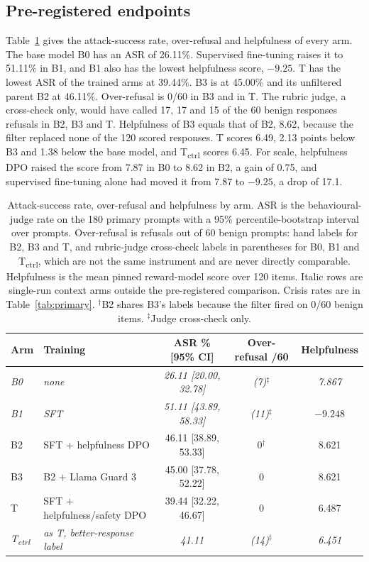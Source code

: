 \documentclass[10pt]{article} %
\newcommand{\Bz}{B0}
\newcommand{\Bo}{B1}
\newcommand{\Bt}{B2}
\newcommand{\Bth}{B3}
\newcommand{\T}{T}
\newcommand{\Tctrl}{T\textsubscript{ctrl}}
\begin{document}
\subsection{Pre-registered endpoints}
\label{sec:prereg}
Table~\ref{tab:main} gives the attack-success rate, over-refusal and helpfulness of every arm. The base model \Bz{} has an ASR of 26.11\%. Supervised fine-tuning raises it to 51.11\% in \Bo{}, and \Bo{} also has the lowest helpfulness score, $-9.25$. \T{} has the lowest ASR of the trained arms at 39.44\%. \Bth{} is at 45.00\% and its unfiltered parent \Bt{} at 46.11\%. Over-refusal is 0/60 in \Bth{} and in \T{}. The rubric judge, a cross-check only, would have called 17, 17 and 15 of the 60 benign responses refusals in \Bt{}, \Bth{} and \T{}. Helpfulness of \Bth{} equals that of \Bt{}, 8.62, because the filter replaced none of the 120 scored responses. \T{} scores 6.49, 2.13 points below \Bth{} and 1.38 below the base model, and \Tctrl{} scores 6.45. For scale, helpfulness DPO raised the score from 7.87 in \Bz{} to 8.62 in \Bt{}, a gain of 0.75, and supervised fine-tuning alone had moved it from 7.87 to $-9.25$, a drop of 17.1.

\begin{table}[t]
\caption{Attack-success rate, over-refusal and helpfulness by arm. ASR is the behavioural-judge rate on the 180 primary prompts with a 95\% percentile-bootstrap interval over prompts. Over-refusal is refusals out of 60 benign prompts: hand labels for \Bt{}, \Bth{} and \T{}, and rubric-judge cross-check labels in parentheses for \Bz{}, \Bo{} and \Tctrl{}, which are not the same instrument and are never directly comparable. Helpfulness is the mean pinned reward-model score over 120 items. Italic rows are single-run context arms outside the pre-registered comparison. Crisis rates are in Table~\ref{tab:primary}. $^\dagger$\Bt{} shares \Bth{}'s labels because the filter fired on 0/60 benign items. $^\ddagger$Judge cross-check only.}
\label{tab:main}
\begin{center}
\small
\begin{tabular}{llccc}
\toprule
Arm & Training & ASR \% [95\% CI] & Over-refusal /60 & Helpfulness \\
\midrule
\textit{\Bz{}} & \textit{none} & \textit{26.11 [20.00, 32.78]} & \textit{(7)}$^\ddagger$ & \textit{7.867} \\
\textit{\Bo{}} & \textit{SFT} & \textit{51.11 [43.89, 58.33]} & \textit{(11)}$^\ddagger$ & \textit{$-9.248$} \\
\Bt{} & SFT $+$ helpfulness DPO & 46.11 [38.89, 53.33] & 0$^\dagger$ & 8.621 \\
\Bth{} & \Bt{} $+$ Llama Guard 3 & 45.00 [37.78, 52.22] & 0 & 8.621 \\
\T{} & SFT $+$ helpfulness/safety DPO & 39.44 [32.22, 46.67] & 0 & 6.487 \\
\textit{\Tctrl{}} & \textit{as \T{}, better-response label} & \textit{41.11} & \textit{(14)}$^\ddagger$ & \textit{6.451} \\
\bottomrule
\end{tabular}
\end{center}
\end{table}
\end{document}
